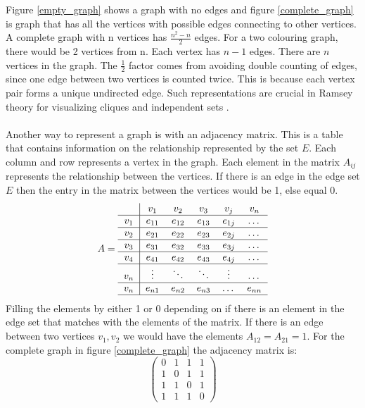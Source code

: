 \documentclass{Assignment}
\begin{document}
Figure \ref{empty_graph} shows a graph with no edges and figure \ref{complete_graph} is graph that has all the vertices with possible edges connecting to other vertices.
A complete graph with n vertices has ${\frac{n^2-n}{2}}$ edges.
For a two colouring graph, there would be 2 vertices from n. 
Each vertex has $n-1$ edges.
There are $n$ vertices in the graph.
The $\frac{1}{2}$ factor comes from avoiding double counting of edges, since one edge between two vertices is counted twice.
This is because each vertex pair forms a unique undirected edge.
Such representations are crucial in Ramsey theory for visualizing cliques and independent sets \cite{BondyMurty2008}.
\\\\
Another way to represent a graph is with an adjacency matrix.
This is a table that contains information on the relationship represented by the set $ E$.
Each column and row represents a vertex in the graph.
Each element in the matrix $A_{ij}$ represents the relationship between the vertices.
If there is an edge in the edge set $E$ then the entry in the matrix between the vertices would be 1, else equal 0.
\begin{equation}
	A = \begin{tabular}{c|ccccc}
		& $v_1$ & $v_2$ & $v_3$ & $v_j$ & $v_n$ \\ \hline
		$v_1$ & $e_{11}$ & $e_{12}$ & $e_{13}$ & $e_{1j}$ & $\dots$ \\ \hline
		$v_2$ & $e_{21}$ & $e_{22}$ & $e_{23}$ & $e_{2j}$ & $\dots$ \\ \hline
		$v_3$ & $e_{31}$ & $e_{32}$ & $e_{33}$ & $e_{3j}$ & $\dots$ \\ \hline
		$v_4$ & $e_{41}$ & $e_{42}$ & $e_{43}$ & $e_{4j}$ & $\dots$ \\ \hline
		$v_n$ & $\vdots$ & $\ddots$ & $\ddots$ & $\vdots$ & $\dots$ \\ \hline
		$v_n$ & $e_{n1}$ & $e_{n2}$ & $e_{n3}$ & $\dots$ & $e_{nn}$ \\ \hline
	\end{tabular}
\end{equation}
Filling the elements by either 1 or 0 depending on if there is an element in the edge set that matches with the elements of the matrix.
If there is an edge between two vertices $v_1 ,v_2$ we would have the elements $A_{12} = A_{21}=1$. 
For the complete graph in figure \ref{complete_graph} the adjacency matrix is:
\begin{equation}
	\begin{pmatrix}
0&1&1&1\\
1&0&1&1\\
1&1&0&1\\
1&1&1&0
	\end{pmatrix}
\end{equation}
\end{document}
